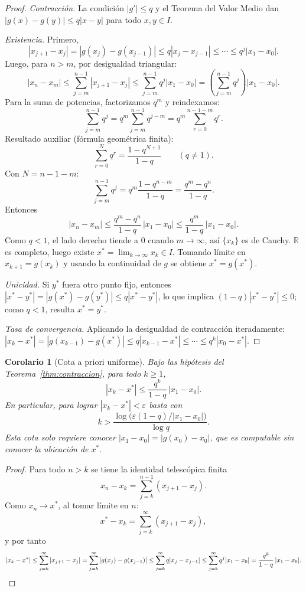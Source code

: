 \documentclass[a4paper,11pt]{report}
\newtheorem{corollary}[theorem]{Corolario}
\begin{document}
\begin{proof}
\textit{Contracción.}
La condición $|g'|\le q$ y el Teorema del Valor Medio dan
$|g(x)-g(y)|\le q|x-y|$ para todo $x,y\in I$.

\textit{Existencia.}
Primero,
\[
|x_{j+1}-x_j|=|g(x_j)-g(x_{j-1})|\le q|x_j-x_{j-1}|\le\cdots\le q^j|x_1-x_0|.
\]
Luego, para $n>m$, por desigualdad triangular:
\[
|x_n-x_m|\le\sum_{j=m}^{n-1}|x_{j+1}-x_j|
           \le\sum_{j=m}^{n-1}q^j|x_1-x_0|
           =\left(\sum_{j=m}^{n-1}q^j\right)|x_1-x_0|.
\]
Para la suma de potencias, factorizamos $q^m$ y reindexamos:
\[
\sum_{j=m}^{n-1}q^j
=q^m\sum_{j=m}^{n-1}q^{j-m}
=q^m\sum_{r=0}^{n-1-m}q^r.
\]
Resultado auxiliar (fórmula geométrica finita):
\[
\sum_{r=0}^{N}q^r=\frac{1-q^{N+1}}{1-q}\qquad(q\neq1).
\]
Con $N=n-1-m$:
\[
\sum_{j=m}^{n-1}q^j
=q^m\frac{1-q^{n-m}}{1-q}
=\frac{q^m-q^n}{1-q}.
\]
Entonces
\[
|x_n-x_m|\le\frac{q^m-q^n}{1-q}\,|x_1-x_0|
           \le\frac{q^m}{1-q}\,|x_1-x_0|.
\]
Como $q<1$, el lado derecho tiende a $0$ cuando $m\to\infty$, así $\{x_k\}$ es de Cauchy.
$\mathbb{R}$ es completo, luego existe $x^*=\lim_{k\to\infty}x_k\in I$.
Tomando límite en $x_{k+1}=g(x_k)$ y usando la continuidad de $g$
se obtiene $x^*=g(x^*)$.

\textit{Unicidad.}
Si $y^*$ fuera otro punto fijo, entonces
$|x^*-y^*|=|g(x^*)-g(y^*)|\le q|x^*-y^*|$,
lo que implica $(1-q)|x^*-y^*|\le0$; como $q<1$, resulta $x^*=y^*$.

\textit{Tasa de convergencia.}
Aplicando la desigualdad de contracción iteradamente:
$|x_k-x^*|=|g(x_{k-1})-g(x^*)|\le q|x_{k-1}-x^*|\le\cdots\le q^k|x_0-x^*|$.
\end{proof}

\begin{corollary}[Cota a priori uniforme]\label{cor:iter_pf}
Bajo las hipótesis del Teorema~\ref{thm:contraccion}, para todo $k\ge1$,
\[
|x_k-x^*|\le\frac{q^k}{1-q}\,|x_1-x_0|.
\]
En particular, para lograr $|x_k-x^*|<\varepsilon$ basta con
\[
k>\frac{\log\!\bigl(\varepsilon(1-q)/|x_1-x_0|\bigr)}{\log q}.
\]
Esta cota solo requiere conocer $|x_1-x_0|=|g(x_0)-x_0|$, que es computable
sin conocer la ubicación de $x^*$.
\end{corollary}

\begin{proof}
Para todo $n>k$ se tiene la identidad telescópica finita
\[
x_n-x_k=\sum_{j=k}^{n-1}(x_{j+1}-x_j).
\]
Como $x_n\to x^*$, al tomar límite en $n$:
\[
x^*-x_k=\sum_{j=k}^{\infty}(x_{j+1}-x_j),
\]
y por tanto
\[
|x_k-x^*|\le\sum_{j=k}^{\infty}|x_{j+1}-x_j|
=\sum_{j=k}^{\infty}|g(x_j)-g(x_{j-1})|
\le\sum_{j=k}^{\infty}q|x_j-x_{j-1}|
\le\sum_{j=k}^{\infty}q^j|x_1-x_0|
=\frac{q^k}{1-q}\,|x_1-x_0|.\qedhere
\]
\end{proof}
\end{document}

